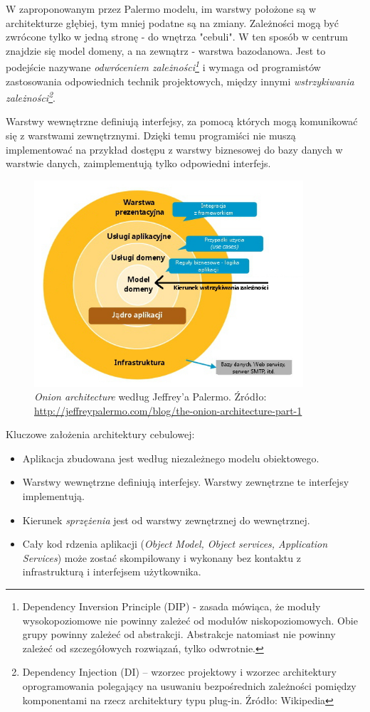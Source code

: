 W zaproponowanym przez Palermo modelu, im warstwy położone są w architekturze głębiej, tym mniej podatne są na zmiany. Zależności mogą być zwrócone tylko w jedną stronę - do wnętrza "cebuli". W ten sposób w centrum znajdzie się model domeny, a na zewnątrz - warstwa bazodanowa. Jest to podejście nazywane \textit{odwróceniem zależności\footnote{Dependency Inversion Principle (DIP) - zasada mówiąca, że moduły wysokopoziomowe nie powinny zależeć od modułów niskopoziomowych. Obie grupy powinny zależeć od abstrakcji. Abstrakcje natomiast nie powinny zależeć od szczegółowych rozwiązań, tylko odwrotnie.}} i wymaga od programistów zastosowania odpowiednich technik projektowych, między innymi \textit{wstrzykiwania zależności\footnote{Dependency Injection (DI) – wzorzec projektowy i wzorzec architektury oprogramowania polegający na usuwaniu bezpośrednich zależności pomiędzy komponentami na rzecz architektury typu plug-in. Źródło: Wikipedia}}.

Warstwy wewnętrzne definiują interfejsy, za pomocą których mogą komunikować się z warstwami zewnętrznymi. Dzięki temu programiści nie muszą implementować na przykład dostępu z warstwy biznesowej do bazy danych w warstwie danych, zaimplementują tylko odpowiedni interfejs.

\begin{figure}[!htb]
    \centering
    \includegraphics[width=10cm]{imgs/ch4_onion_architecture.jpg}
    \caption
{\textit{Onion architecture} według Jeffrey'a Palermo. Źródło: \url{http://jeffreypalermo.com/blog/the-onion-architecture-part-1}}
    \label{fig:onion_architecture}
\end{figure} 

Kluczowe założenia architektury cebulowej:
\begin{itemize}
\item 
Aplikacja zbudowana jest według niezależnego modelu obiektowego.
\item
Warstwy wewnętrzne definiują interfejsy. Warstwy zewnętrzne te interfejsy implementują.
\item
Kierunek \textit{sprzężenia} jest od warstwy zewnętrznej do wewnętrznej.
\item
Cały kod rdzenia aplikacji (\textit{Object Model, Object services, Application Services}) może zostać skompilowany i wykonany bez kontaktu z infrastrukturą i interfejsem użytkownika.
\end{itemize}


